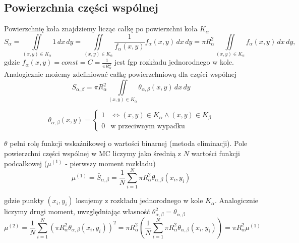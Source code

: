 \documentclass[a4paper,12pt,twoside]{article}
\begin{document}
\subsection{Powierzchnia części wspólnej}


Powierzchnię koła znajdziemy licząc całkę po powierzchni koła \( K_\alpha \)
\begin{equation}
S_\alpha = \iint\limits_{(x,y)\in K_\alpha} 1 \, dx\,dy = \iint\limits_{(x,y)\in K_\alpha} \frac{1}{f_\alpha(x,y)} f_\alpha(x,y)\,dx\,dy = \pi R_\alpha^2 \iint\limits_{(x,y)\in K_\alpha} f_\alpha(x,y)\,dx\,dy,
\end{equation}
 gdzie $f_\alpha(x,y) = const = C = \frac{1}{\pi R^2_{\alpha}}$ jest fgp rozkładu jednorodnego w kole. \\


Analogicznie możemy zdefiniować całkę powierzchniową dla części wspólnej
\begin{equation}
S_{\alpha,\beta} = \pi R_\alpha^2 \iint\limits_{(x,y)\in K_\alpha} \theta_{\alpha,\beta}(x,y)\,dx\,dy
\end{equation}

\begin{equation}
\theta_{\alpha,\beta}(x,y) = 
\begin{cases}
1 &\Leftrightarrow (x,y) \in K_\alpha \wedge (x,y) \in K_\beta \\
0 & \text{w przeciwnym wypadku}
\end{cases}
\end{equation}

\(\theta\) pełni rolę funkcji wskaźnikowej o wartości binarnej (metoda eliminacji). Pole powierzchni części wspólnej w MC liczymy jako średnią z \(N\) wartości funkcji podcałkowej (\(\mu^{(1)}\) - pierwszy moment rozkładu)
\begin{equation}
\mu^{(1)} = \bar{S}_{\alpha,\beta} = \frac{1}{N} \sum_{i=1}^N \pi R_\alpha^2 \theta_{\alpha,\beta}(x_i,y_i)
\end{equation}

gdzie punkty \((x_i, y_i)\) losujemy z rozkładu jednorodnego w kole \(K_\alpha\). Analogicznie liczymy drugi moment, uwzględniając własność \(\theta_{\alpha,\beta}^2 = \theta_{\alpha,\beta}\)
\begin{equation}
\mu^{(2)} = \frac{1}{N} \sum_{i=1}^N \left( \pi R_\alpha^2 \theta_{\alpha,\beta}(x_i,y_i) \right)^2 = \pi R_\alpha^2 \left( \frac{1}{N} \sum_{i=1}^N \pi R_\alpha^2 \theta_{\alpha,\beta}(x_i,y_i) \right) = \pi R_\alpha^2 \mu^{(1)}
\end{equation}
\end{document}
